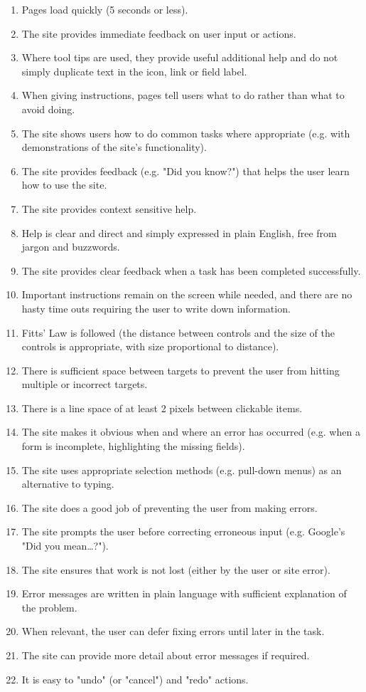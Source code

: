 \begin{itemize}
\begin{enumerate}
        \item Pages load quickly (5 seconds or less).
        \item The site provides immediate feedback on user input or actions.
        \item Where tool tips are used, they provide useful additional help and do not simply duplicate text in the icon, link or field label.
        \item When giving instructions, pages tell users what to do rather than what to avoid doing.
        \item The site shows users how to do common tasks where appropriate (e.g. with demonstrations of the site's functionality).
        \item The site provides feedback (e.g. "Did you know?") that helps the user learn how to use the site.
        \item The site provides context sensitive help.
        \item Help is clear and direct and simply expressed in plain English, free from jargon and buzzwords.
        \item The site provides clear feedback when a task has been completed successfully.
        \item Important instructions remain on the screen while needed, and there are no hasty time outs requiring the user to write down information.
        \item Fitts' Law is followed (the distance between controls and the size of the controls is appropriate, with size proportional to distance).
        \item There is sufficient space between targets to prevent the user from hitting multiple or incorrect targets.
        \item There is a line space of at least 2 pixels between clickable items.
        \item The site makes it obvious when and where an error has occurred (e.g. when a form is incomplete, highlighting the missing fields).
        \item The site uses appropriate selection methods (e.g. pull-down menus) as an alternative to typing.
        \item The site does a good job of preventing the user from making errors.
        \item The site prompts the user before correcting erroneous input (e.g. Google's "Did you mean…?").
        \item The site ensures that work is not lost (either by the user or site error).
        \item Error messages are written in plain language with sufficient explanation of the problem.
        \item When relevant, the user can defer fixing errors until later in the task.
        \item The site can provide more detail about error messages if required.
        \item It is easy to "undo" (or "cancel") and "redo" actions.        
      \end{enumerate}
\end{itemize}



